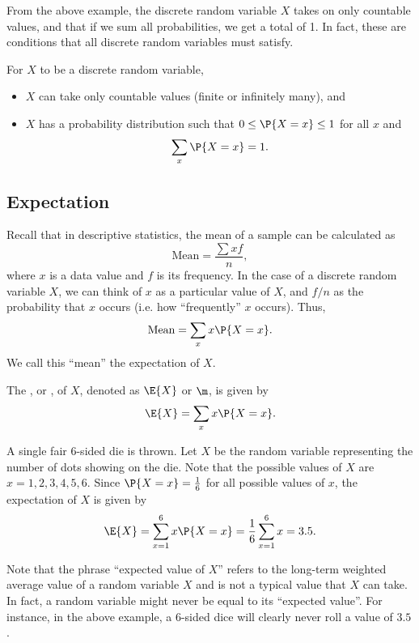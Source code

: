 From the above example, the discrete random variable $X$ takes on only countable values, and that if we sum all probabilities, we get a total of 1. In fact, these are conditions that all discrete random variables must satisfy.

\begin{condition}
    For $X$ to be a discrete random variable,
    \begin{itemize}
        \item $X$ can take only countable values (finite or infinitely many), and
        \item $X$ has a probability distribution such that $0 \leq \P{X = x} \leq 1$ for all $x$ and \[\sum_{x} \P{X = x} = 1.\]
    \end{itemize}
\end{condition}

\subsection{Expectation}

Recall that in descriptive statistics, the mean of a sample can be calculated as \[\text{Mean} = \frac{\sum xf}{n},\] where $x$ is a data value and $f$ is its frequency. In the case of a discrete random variable $X$, we can think of $x$ as a particular value of $X$, and $f/n$ as the probability that $x$ occurs (i.e. how ``frequently'' $x$ occurs). Thus, \[\text{Mean} = \sum_{x} x \P{X = x}.\] We call this ``mean'' the expectation of $X$.

\begin{definition}
    The , or , of $X$, denoted as $\E{X}$ or $\m$, is given by \[\E{X} = \sum_{x} x \P{X = x}.\]
\end{definition}

\begin{example}
    A single fair 6-sided die is thrown. Let $X$ be the random variable representing the number of dots showing on the die. Note that the possible values of $X$ are $x = 1, 2, 3, 4, 5, 6$. Since $\P{X = x} = \frac16$ for all possible values of $x$, the expectation of $X$ is given by \[\E{X} = \sum_{x = 1}^6 x\P{X = x} = \frac16 \sum_{x= 1}^6 x = 3.5.\]
\end{example}

Note that the phrase ``expected value of $X$'' refers to the long-term weighted average value of a random variable $X$ and is not a typical value that $X$ can take. In fact, a random variable might never be equal to its ``expected value''. For instance, in the above example, a 6-sided dice will clearly never roll a value of $3.5$.


